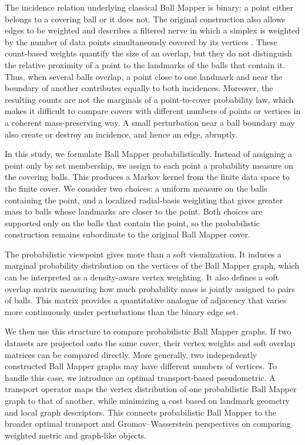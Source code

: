 \documentclass[9pt,a4paper,twocolumn,twoside]{extarticle}
\theoremstyle{definition}
\begin{document}
The incidence relation underlying classical Ball Mapper is binary: a point either belongs to a covering ball or it does not. The original construction also allows edges to be weighted and describes a filtered nerve in which a simplex is weighted by the number of data points simultaneously covered by its vertices \cite{dlotko2019ballmapper}. These count-based weights quantify the size of an overlap, but they do not distinguish the relative proximity of a point to the landmarks of the balls that contain it. Thus, when several balls overlap, a point close to one landmark and near the boundary of another contributes equally to both incidences. Moreover, the resulting counts are not the marginals of a point-to-cover probability law, which makes it difficult to compare covers with different numbers of points or vertices in a coherent mass-preserving way. A small perturbation near a ball boundary may also create or destroy an incidence, and hence an edge, abruptly.

In this study, we formulate Ball Mapper probabilistically. Instead of assigning a point only by set membership, we assign to each point a probability measure on the covering balls. This produces a Markov kernel from the finite data space to the finite cover. We consider two choices: a uniform measure on the balls containing the point, and a localized radial-basis weighting that gives greater mass to balls whose landmarks are closer to the point. Both choices are supported only on the balls that contain the point, so the probabilistic construction remains subordinate to the original Ball Mapper cover. 

The probabilistic viewpoint gives more than a soft visualization. It induces a marginal probability distribution on the vertices of the Ball Mapper graph, which can be interpreted as a density-aware vertex weighting. It also defines a soft overlap matrix measuring how much probability mass is jointly assigned to pairs of balls. This matrix provides a quantitative analogue of adjacency that varies more continuously under perturbations than the binary edge set. 

We then use this structure to compare probabilistic Ball Mapper graphs. If two datasets are projected onto the same cover, their vertex weights and soft overlap matrices can be compared directly. More generally, two independently constructed Ball Mapper graphs may have different numbers of vertices. To handle this case, we introduce an optimal transport-based pseudometric. A transport operator maps the vertex distribution of one probabilistic Ball Mapper graph to that of another, while minimizing a cost based on landmark geometry and local graph descriptors. This connects probabilistic Ball Mapper to the broader optimal transport and Gromov--Wasserstein perspectives on comparing weighted metric and graph-like objects. 
\end{document}

